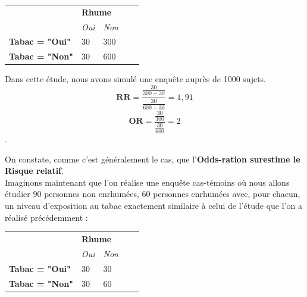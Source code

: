 \begin{center}
\begin{tabular}{l|l|l|ll}
\cline{2-3}
 & \multicolumn{2}{l|}{\textbf{Rhume}} &  &  \\ \cline{2-3}
 & \textit{Oui} & \textit{Non} &  &  \\ \cline{1-3}
\multicolumn{1}{|l|}{\textbf{Tabac = "Oui"}} & 30 & 300 &  &  \\ \cline{1-3}
\multicolumn{1}{|l|}{\textbf{Tabac = "Non"}} & 30 & 600 &  &  \\  \cline{1-3}
\end{tabular}
\end{center}
Dans cette étude, nous avons simulé une enquête auprès de 1000 sujets.
$$\mathbf{\textrm{RR}} = \frac{\frac{30}{300+30}}{\frac{30}{600+30}} = 1,91$$
$$\mathbf{\textrm{OR}} = \frac{\frac{30}{300}}{\frac{30}{600}}=2$$.

On constate, comme c'est généralement le cas, que l'\textbf{Odds-ration surestime le Risque relatif}.\newline  
\\
Imaginons maintenant que l'on réalise une enquête cas-témoins où nous allons étudier 90 personnes non enrhumées, 60 personnes enrhumées avec, pour chacun, un niveau d'exposition au tabac exactement similaire à celui de l'étude que l'on a réalisé précédemment :
\begin{center}
\begin{tabular}{l|l|l|ll}
\cline{2-3}
 & \multicolumn{2}{l|}{\textbf{Rhume}} &  &  \\ \cline{2-3}
 & \textit{Oui} & \textit{Non} &  &  \\ \cline{1-3}
\multicolumn{1}{|l|}{\textbf{Tabac = "Oui"}} & 30 & 30 &  &  \\ \cline{1-3}
\multicolumn{1}{|l|}{\textbf{Tabac = "Non"}} & 30 & 60 &  &  \\ \cline{1-3}
\end{tabular}
\end{center}

